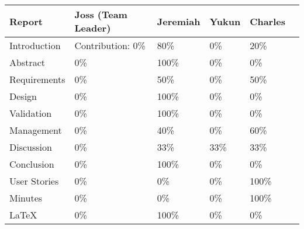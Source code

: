\documentclass[11pt, a4paper]{report}
\begin{document}
{  \vspace*{1cm}

  \noindent\begin{tabular}{|l||l|l|l|l|l|}\hline
    \textbf{Report} & \textbf{Joss (Team Leader)} & \textbf{Jeremiah} & \textbf{Yukun} & \textbf{Charles} \\ \hline\hline
    Introduction    & Contribution: 0\%           & 80\%              & 0\%            & 20\%             \\ \hline
    Abstract        & 0\%                         & 100\%             & 0\%            & 0\%              \\ \hline
    Requirements    & 0\%                         & 50\%              & 0\%            & 50\%             \\ \hline
    Design          & 0\%                         & 100\%             & 0\%            & 0\%              \\ \hline
    Validation      & 0\%                         & 100\%             & 0\%            & 0\%              \\ \hline
    Management      & 0\%                         & 40\%              & 0\%            & 60\%             \\ \hline
    Discussion      & 0\%                         & 33\%              & 33\%           & 33\%             \\ \hline
    Conclusion      & 0\%                         & 100\%             & 0\%            & 0\%              \\ \hline
    User Stories    & 0\%                         & 0\%               & 0\%            & 100\%            \\ \hline
    Minutes         & 0\%                         & 0\%               & 0\%            & 100\%            \\ \hline
    \LaTeX          & 0\%                         & 100\%             & 0\%            & 0\%              \\ \hline
  \end{tabular}
}

\tableofcontents
\thispagestyle{empty}
\end{document}
